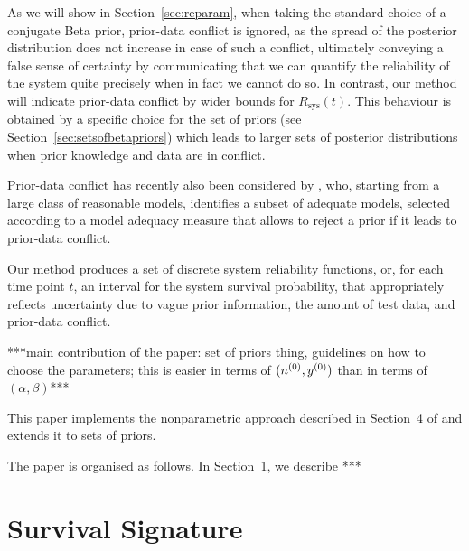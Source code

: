\documentclass[12pt, a4paper]{elsarticle}
\newcommand{\Rsys}{R_\text{sys}}
\begin{document}
As we will show in Section~\ref{sec:reparam}, when taking the standard choice of a conjugate Beta prior,
prior-data conflict is ignored, as the spread of the posterior distribution does not increase in case of such a conflict,
ultimately conveying a false sense of certainty
by communicating that we can quantify the reliability of the system quite precisely when in fact we cannot do so.
In contrast, our method will indicate prior-data conflict by wider bounds for $\Rsys(t)$.
This behaviour is obtained by a specific choice for the set of priors (see Section~\ref{sec:setsofbetapriors})
which leads to larger sets of posterior distributions when prior knowledge and data are in conflict.

Prior-data conflict has recently also been considered by \citet{2015:bickel},
who, starting from a large class of reasonable models,
identifies a subset of adequate models,
selected according to a model adequacy measure that allows to reject a prior if it leads to prior-data conflict.



Our method produces a set of discrete system reliability functions,
or, for each time point $t$, an interval for the system survival probability,
that appropriately reflects uncertainty due to vague prior information, the amount of test data, and prior-data conflict.

***main contribution of the paper:
set of priors thing,
guidelines on how to choose the parameters;
this is easier in terms of $(n^{(0)}, y^{(0)})$ than in terms of $(\alpha, \beta)$***

This paper implements the nonparametric approach described in Section~4 of \citet{2015:bayessurvsign}
and extends it to sets of priors.

The paper is organised as follows.
In Section~\ref{sec:survsign}, we describe ***


\section{Survival Signature}
\label{sec:survsign}
\end{document}

